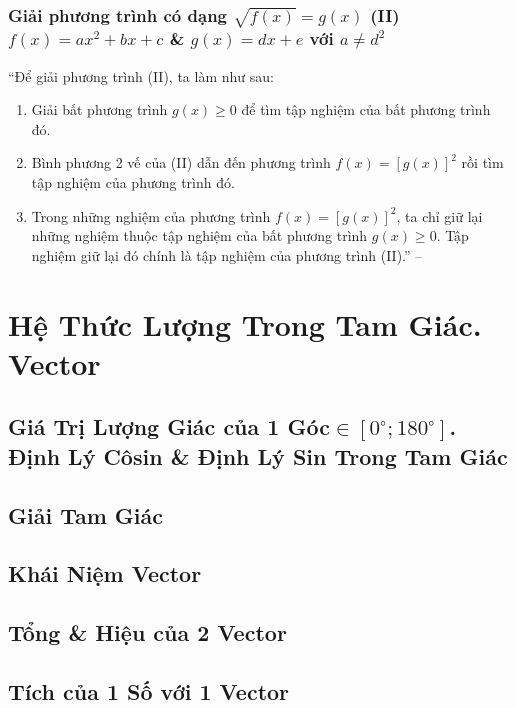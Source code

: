 \documentclass[oneside]{book}
\numberwithin{equation}{section}
\begin{document}
\subsection{Giải phương trình có dạng $\sqrt{f(x)} = g(x)$ (II) $f(x) = ax^2 + bx + c$ \& $g(x) = dx + e$ với $a\ne d^2$}
``Để giải phương trình (II), ta làm như sau:
\begin{enumerate}
	\item Giải bất phương trình $g(x)\ge 0$ để tìm tập nghiệm của bất phương trình đó.
	\item Bình phương 2 vế của (II) dẫn đến phương trình $f(x) = [g(x)]^2$ rồi tìm tập nghiệm của phương trình đó.
	\item Trong những nghiệm của phương trình $f(x) = [g(x)]^2$, ta chỉ giữ lại những nghiệm thuộc tập nghiệm của bất phương trình $g(x)\ge 0$. Tập nghiệm giữ lại đó chính là tập nghiệm của phương trình (II).'' -- \cite[p. 57]{SGK_Toan_10_Canh_Dieu_tap_1}
\end{enumerate}


\chapter{Hệ Thức Lượng Trong Tam Giác. Vector}

\section{Giá Trị Lượng Giác của 1 Góc$\in[0^\circ;180^\circ]$. Định Lý Côsin \& Định Lý Sin Trong Tam Giác}

\section{Giải Tam Giác}

\section{Khái Niệm Vector}

\section{Tổng \& Hiệu của 2 Vector}

\section{Tích của 1 Số với 1 Vector}
\end{document}
